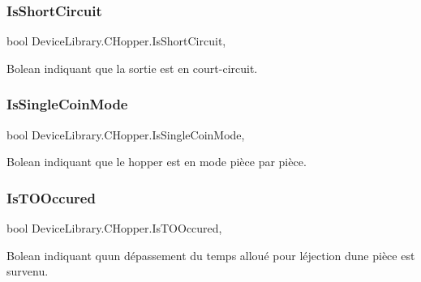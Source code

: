 \subsubsection{\texorpdfstring{Is\+Short\+Circuit}{IsShortCircuit}}
{\footnotesize\ttfamily bool Device\+Library.\+C\+Hopper.\+Is\+Short\+Circuit\hspace{0.3cm}{\ttfamily [get]}, {\ttfamily [set]}}



Bolean indiquant que la sortie est en court-\/circuit. 

\mbox{\label{class_device_library_1_1_c_hopper_ac8bdea555bab297e4533885935005ad9}} 
\subsubsection{\texorpdfstring{Is\+Single\+Coin\+Mode}{IsSingleCoinMode}}
{\footnotesize\ttfamily bool Device\+Library.\+C\+Hopper.\+Is\+Single\+Coin\+Mode\hspace{0.3cm}{\ttfamily [get]}, {\ttfamily [set]}}



Bolean indiquant que le hopper est en mode pièce par pièce. 

\mbox{\label{class_device_library_1_1_c_hopper_adf2e0f18bd630e28e89aea2f45ef6a19}} 
\subsubsection{\texorpdfstring{Is\+T\+O\+Occured}{IsTOOccured}}
{\footnotesize\ttfamily bool Device\+Library.\+C\+Hopper.\+Is\+T\+O\+Occured\hspace{0.3cm}{\ttfamily [get]}, {\ttfamily [set]}}



Bolean indiquant qu\textquotesingle{}un dépassement du temps alloué pour l\textquotesingle{}éjection d\textquotesingle{}une pièce est survenu. 

